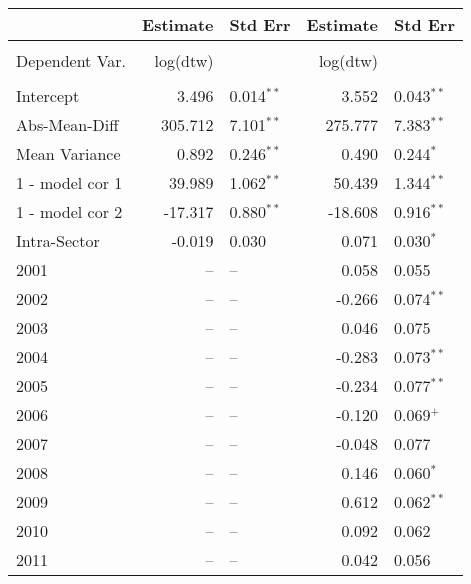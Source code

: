 \documentclass[12pt]{article}
\begin{document}
\begin{table}
    \centering
    \begin{tabular}{l r l r l}
         & Estimate & Std Err & Estimate & Std Err \\
        \hline
        \vspace{-1mm} \\
        Dependent Var.  & log(dtw)&                 & log(dtw)&                 \\
        \\
        Intercept       &   3.496 &  0.014{$^{**}$} &   3.552 & 0.043{$^{**}$}  \\
        Abs-Mean-Diff   & 305.712 &  7.101{$^{**}$} & 275.777 & 7.383{$^{**}$}  \\
        Mean Variance   &   0.892 &  0.246{$^{**}$} &   0.490 & 0.244{$^{*}$}   \\
        1 - model cor 1 &  39.989 &  1.062{$^{**}$} &  50.439 & 1.344{$^{**}$}  \\
        1 - model cor 2 & -17.317 &  0.880{$^{**}$} & -18.608 & 0.916{$^{**}$}  \\
        Intra-Sector    &  -0.019 &  0.030{$^{  }$} &   0.071 & 0.030{$^{*}$}   \\
        2001            &      -- &              -- &   0.058 & 0.055           \\
        2002            &      -- &              -- &  -0.266 & 0.074{$^{**}$}  \\
        2003            &      -- &              -- &   0.046 & 0.075           \\
        2004            &      -- &              -- &  -0.283 & 0.073{$^{**}$}  \\
        2005            &      -- &              -- &  -0.234 & 0.077{$^{**}$}  \\
        2006            &      -- &              -- &  -0.120 & 0.069{$^{+}$}   \\
        2007            &      -- &              -- &  -0.048 & 0.077           \\
        2008            &      -- &              -- &   0.146 & 0.060{$^{*}$}   \\
        2009            &      -- &              -- &   0.612 & 0.062{$^{**}$}  \\
        2010            &      -- &              -- &   0.092 & 0.062           \\
        2011            &      -- &              -- &   0.042 & 0.056           \\

\end{tabular}
\end{table}
\end{document}
